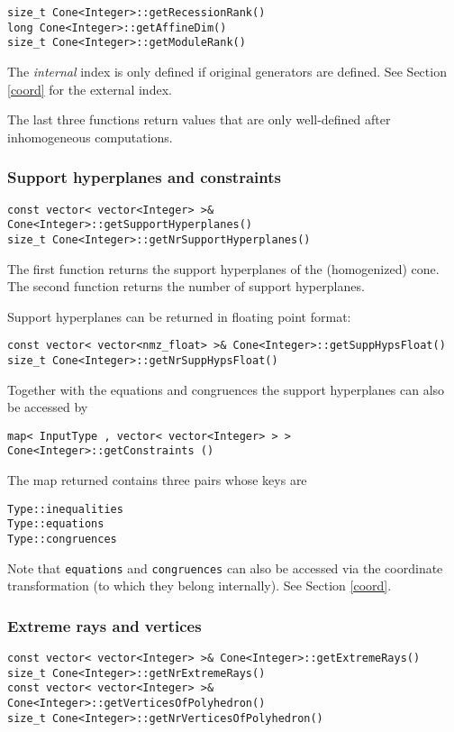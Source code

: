 \documentclass[12pt,a4paper]{scrartcl}
\theoremstyle{definition}
\begin{document}
\begin{small}
\begin{Verbatim}
size_t Cone<Integer>::getRecessionRank()
long Cone<Integer>::getAffineDim()
size_t Cone<Integer>::getModuleRank()
\end{Verbatim}

The \emph{internal} index is only defined if original generators are defined. See Section \ref{coord} for the external index.

The last three functions return values that are only well-defined after inhomogeneous computations.

\subsubsection{Support hyperplanes and constraints}\label{SHC}

\begin{Verbatim}
const vector< vector<Integer> >& Cone<Integer>::getSupportHyperplanes()
size_t Cone<Integer>::getNrSupportHyperplanes()
\end{Verbatim}

The first function returns the support hyperplanes of the (homogenized) cone.
The second function returns the number of support hyperplanes.

Support hyperplanes can be returned in floating point format:
\begin{Verbatim}
const vector< vector<nmz_float> >& Cone<Integer>::getSuppHypsFloat()
size_t Cone<Integer>::getNrSuppHypsFloat()
\end{Verbatim}

Together with the equations and congruences the support hyperplanes can also be accessed by
\begin{Verbatim}
map< InputType , vector< vector<Integer> > > Cone<Integer>::getConstraints ()
\end{Verbatim}
The map returned contains three pairs whose keys are
\begin{Verbatim}
Type::inequalities
Type::equations
Type::congruences
\end{Verbatim}

Note that \verb|equations|  and \verb|congruences| can also be accessed via the coordinate transformation (to which they belong internally). See Section \ref{coord}.

\subsubsection{Extreme rays and vertices}

\begin{Verbatim}
const vector< vector<Integer> >& Cone<Integer>::getExtremeRays()
size_t Cone<Integer>::getNrExtremeRays()
const vector< vector<Integer> >& Cone<Integer>::getVerticesOfPolyhedron()
size_t Cone<Integer>::getNrVerticesOfPolyhedron()
\end{Verbatim}


\end{small}
\end{document}
